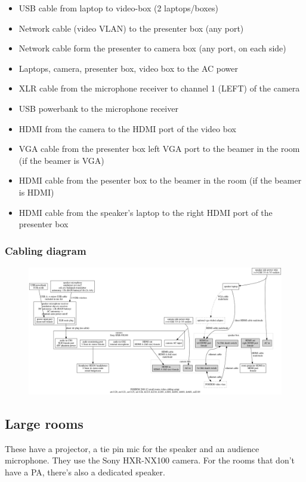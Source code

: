 \documentclass{article}
\begin{document}
\begin{itemize}
  \item USB cable from laptop to video-box (2 laptops/boxes)
  \item Network cable (video VLAN) to the presenter box (any port)
  \item Network cable form the presenter to camera box (any port, on each side)
  \item Laptops, camera, presenter box, video box to the AC power
  \item XLR cable from the microphone receiver to channel 1 (LEFT) of the camera
  \item USB powerbank to the microphone receiver
  \item HDMI from the camera to the HDMI port of the video box
  \item VGA cable from the presenter box left VGA port to the beamer in the room (if the beamer is VGA)
  \item HDMI cable from the pesenter box to the beamer in the room (if the beamer is HDMI)
  \item HDMI cable from the speaker's laptop to the right HDMI port of the presenter box
\end{itemize}
\subsubsection{Cabling diagram}
\begin{figure}[H]
  \begin{sideways}
  \centering
  \includegraphics[width = 200mm]{../../graph/cabling_small_rooms.png}
  \end{sideways}
\end{figure}

\subsection{Large rooms}
These have a projector, a tie pin mic for the speaker and an audience microphone. They use the Sony HXR-NX100 camera. For the rooms that don't have a PA, there's also a dedicated speaker.
\end{document}
